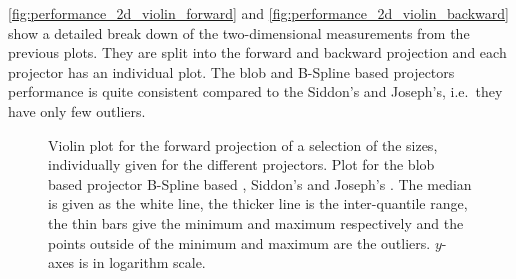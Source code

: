\autoref{fig:performance_2d_violin_forward} and \autoref{fig:performance_2d_violin_backward} show a
detailed break down of the two-dimensional measurements from the previous plots. They are split into
the forward and backward projection and each projector has an individual plot. The blob and B-Spline
based projectors performance is quite consistent compared to the Siddon's and Joseph's, i.e.\ they
have only few outliers.

\begin{figure}
	\centering



	\caption{Violin plot for the forward projection of a selection of the sizes, individually
		given for the different projectors. Plot for the blob based projector
		 B-Spline based
		, Siddon's
		 and Joseph's
                . The median is given as the white
                line, the thicker line is the inter-quantile range, the thin bars give the minimum
                and maximum respectively and the points outside of the minimum and maximum are the
                outliers. \(y\)-axes is in logarithm scale.}%
	\label{fig:performance_2d_violin_forward}
\end{figure}

